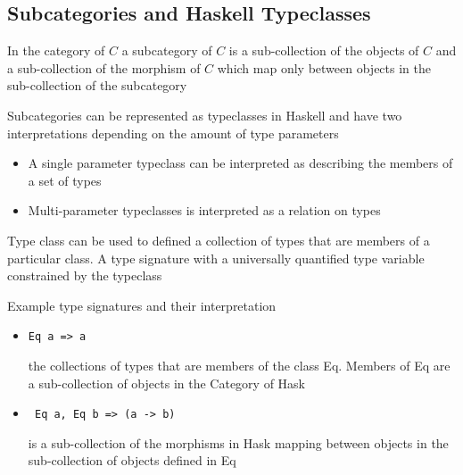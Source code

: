 \subsection {Subcategories and Haskell Typeclasses}


In the category of $C$ a subcategory of $C$ is a sub-collection of the objects of $C$ and a sub-collection of the morphism of $C$ which map only between objects in the sub-collection of the subcategory

Subcategories can be represented as typeclasses in Haskell and have two interpretations depending on the amount of type parameters

\begin{itemize}
  \item A single parameter typeclass can be interpreted as describing the members of a set of types
  \item Multi-parameter typeclasses is interpreted as a relation on types
\end{itemize}

Type class can be used to defined a collection of types that are members of a particular class. A type signature with a universally quantified type variable constrained by the typeclass 

Example type signatures and their interpretation

\begin{itemize}
  \item \begin{verbatim}Eq a => a \end{verbatim} the collections of types that are members of the class Eq. Members of Eq are a sub-collection of objects in the Category of Hask
  \item \begin{verbatim} Eq a, Eq b => (a -> b) \end{verbatim} is a sub-collection of the morphisms in Hask mapping between objects in the sub-collection of objects defined in Eq
\end{itemize}
